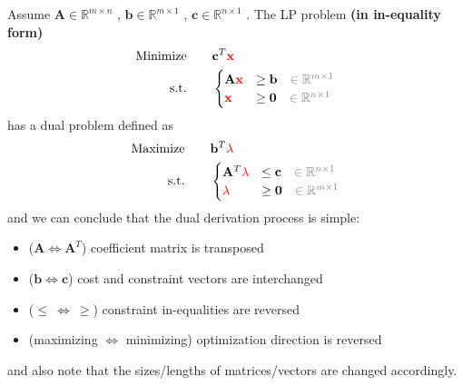 \documentclass[twocolumn]{ctexart}
\begin{document}
Assume
$\mathbf{A} \in \mathbb{R}^{m \times n}$
,
$\mathbf{b} \in \mathbb{R}^{m \times 1}$
,
$\mathbf{c} \in \mathbb{R}^{n \times 1}$
.
The LP problem \textbf{\color{blue} (in in-equality form)}
\begin{equation}
    \begin{aligned}
        \label{eq:primal}
        \text{Minimize} \qquad &
            \mathbf{c}^T  \mathbf{\color{red} x}
        \\
        \text{s.t.} \qquad &
            \begin{cases}
                \mathbf{A}  \mathbf{\color{red} x}  &  \geq  \mathbf{b}  {\color{gray} \quad \in \mathbb{R}^{m \times 1}}  \\
                            \mathbf{\color{red} x}  &  \geq  \mathbf{0}  {\color{gray} \quad \in \mathbb{R}^{n \times 1}}  \\
            \end{cases}
    \end{aligned}
\end{equation}
has a dual problem defined as
\begin{equation}
    \begin{aligned}
        \label{eq:dual}
        \text{Maximize} \qquad &
            \mathbf{b}^T  \mathbf{\color{red} \lambda}
        \\
        \text{s.t.} \qquad &
            \begin{cases}
                \mathbf{A}^T  \mathbf{\color{red} \lambda}  &  \leq  \mathbf{c}  {\color{gray} \quad \in \mathbb{R}^{n \times 1}}  \\
                              \mathbf{\color{red} \lambda}  &  \geq  \mathbf{0}  {\color{gray} \quad \in \mathbb{R}^{m \times 1}}  \\
            \end{cases}
    \end{aligned}
\end{equation}
and we can conclude that the dual derivation process is simple:
\begin{itemize}
    \item  ($\mathbf{A} \Leftrightarrow \mathbf{A}^T$) coefficient matrix is transposed
    \item  ($\mathbf{b} \Leftrightarrow \mathbf{c}$) cost and constraint vectors are interchanged
    \item  ($\leq \  \Leftrightarrow \  \geq$) constraint in-equalities are reversed
    \item  (maximizing $\Leftrightarrow$ minimizing) optimization direction is reversed
\end{itemize}
and also note that the sizes/lengths of matrices/vectors are changed accordingly.
\end{document}
